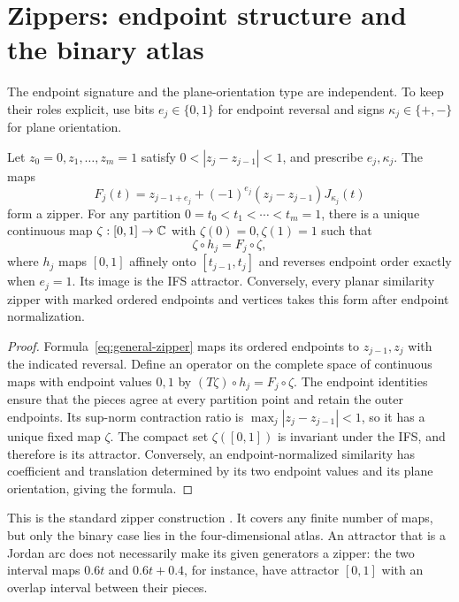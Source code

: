 \section{Zippers: endpoint structure and the binary atlas}
\label{sec:core-zippers}

The endpoint signature and the plane-orientation type are independent.
To keep their roles explicit, use bits $e_j\in\{0,1\}$ for endpoint
reversal and signs $\kappa_j\in\{+,-\}$ for plane orientation.

\begin{proposition}
\label{prop:general-zipper}
Let $z_0=0,z_1,\ldots,z_m=1$ satisfy
$0<|z_j-z_{j-1}|<1$, and prescribe $e_j,\kappa_j$. The maps
\begin{equation}\label{eq:general-zipper}
F_j(t)=z_{j-1+e_j}+(-1)^{e_j}(z_j-z_{j-1})J_{\kappa_j}(t)
\end{equation}
form a zipper. For any partition
$0=t_0<t_1<\cdots<t_m=1$, there is a unique continuous map
$\zeta:[0,1]\to\mathbb C$ with $\zeta(0)=0,\zeta(1)=1$ such that
\[
\zeta\circ h_j=F_j\circ \zeta,
\]
where $h_j$ maps $[0,1]$ affinely onto $[t_{j-1},t_j]$ and reverses
endpoint order exactly when $e_j=1$. Its image is the IFS attractor.
Conversely, every planar similarity zipper with marked ordered
endpoints and vertices takes this form after endpoint normalization.
\end{proposition}
\begin{proof}
Formula~\eqref{eq:general-zipper} maps its ordered endpoints to
$z_{j-1},z_j$ with the indicated reversal. Define an operator on
the complete space of continuous maps with endpoint values $0,1$
by $(T\zeta)\circ h_j=F_j\circ \zeta$. The endpoint identities ensure that
the pieces agree at every partition point and retain the outer
endpoints. Its sup-norm contraction ratio is
$\max_j|z_j-z_{j-1}|<1$, so it has a unique fixed map $\zeta$.
The compact set $\zeta([0,1])$ is invariant under the IFS, and therefore
is its attractor. Conversely, an endpoint-normalized similarity has
coefficient and translation determined by its two endpoint values
and its plane orientation, giving the formula.
\end{proof}

This is the standard zipper construction \cite{Aseev2003}. It
covers any finite number of maps, but only the binary case lies
in the four-dimensional atlas. An attractor that is a Jordan arc
does not necessarily make its given generators a zipper: the two
interval maps $0.6t$ and $0.6t+0.4$, for instance, have attractor
$[0,1]$ with an overlap interval between their pieces.

